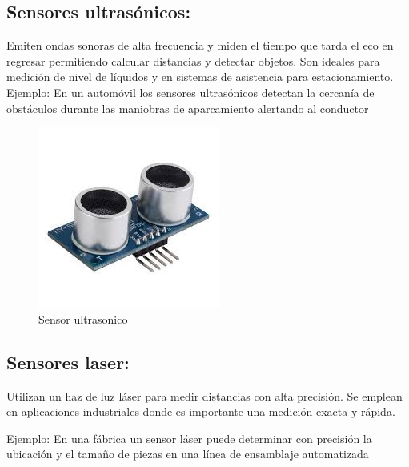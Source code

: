 \subsection{Sensores ultrasónicos:  }

Emiten ondas sonoras de alta frecuencia y miden el tiempo que tarda el eco en regresar permitiendo calcular distancias y detectar objetos. Son ideales para medición de nivel de líquidos y en sistemas de asistencia para estacionamiento.
Ejemplo: En un automóvil los sensores ultrasónicos detectan la cercanía de obstáculos durante las maniobras de aparcamiento alertando al conductor


\begin{figure}[h]
	\centering
	\includegraphics[width=0.7\linewidth]{img/sensor ultrasonico.jpg}
	\caption{Sensor ultrasonico}
	\label{fig:insertarimagen}
\end{figure}

\subsection{Sensores laser:  }
Utilizan un haz de luz láser para medir distancias con alta precisión. Se emplean en aplicaciones industriales donde es importante una medición exacta y rápida.

Ejemplo: En una fábrica un sensor láser puede determinar con precisión la ubicación y el tamaño de piezas en una línea de ensamblaje automatizada

